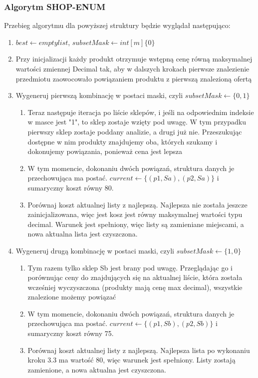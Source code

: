 \documentclass[a4paper]{article}
\begin{document}
\subsubsection{Algorytm SHOP-ENUM}
Przebieg algorytmu dla powyższej struktury będzie wyglądał następująco:
\begin{enumerate}
\item {$best \leftarrow empty list$, $subsetMask \leftarrow int[m]\{0\}$}
\item{ Przy inicjalizacji każdy produkt otrzymuje wstępną cenę równą maksymalnej wartości zmiennej Decimal tak, aby w dalszych krokach pierwsze znalezienie przedmiotu zaowocowało powiązaniem produktu z pierwszą znalezioną ofertą}
\item {Wygeneruj pierwszą kombinację w postaci maski, czyli $subsetMask \leftarrow \{0, 1\}$
\begin{enumerate}
\item {Teraz następuje iteracja po liście sklepów, i jeśli na odpowiednim indeksie w masce jest "1", to sklep zostaje wzięty pod uwagę. W tym przypadku pierwszy sklep zostaje poddany analizie, a drugi już nie. Przeszukując dostępne w nim produkty znajdujemy oba, których szukamy i dokonujemy powiązania, ponieważ cena jest lepsza}
\item{W tym momencie, dokonaniu dwóch powiązań, struktura danych je przechowująca ma postać.
$current \leftarrow \{(p1, Sa), (p2, Sa)\}$ i sumaryczny koszt równy 80.}
\item {Porównaj koszt aktualnej listy z najlepszą. Najlepsza nie została jeszcze zainicjalizowana, więc jest kosz jest równy maksymalnej wartości typu decimal. Warunek jest spełniony, więc listy są zamieniane miejscami, a nowa aktualna lista jest czyszczona.}
\end{enumerate}}
\item {Wygeneruj drugą kombinację w postaci maski, czyli $subsetMask \leftarrow \{1, 0\}$
\begin{enumerate}
\item {Tym razem tylko sklep Sb jest brany pod uwagę. Przeglądając go i porównując ceny do znajdujących się na aktualnej liście, która została wcześniej wyczyszczona (produkty mają cenę max decimal), wszystkie znalezione możemy powiązać}
\item{W tym momencie, dokonaniu dwóch powiązań, struktura danych je przechowująca ma postać.
$current \leftarrow \{(p1, Sb), (p2, Sb)\}$ i sumaryczny koszt równy 75.}
\item {Porównaj koszt aktualnej listy z najlepszą. Najlepsza lista po wykonaniu kroku 3.3 ma wartość 80, więc warunek jest spełniony. Listy zostają zamienione, a nowa aktualna jest czyszczona.}

\end{enumerate}}
\end{enumerate}
\end{document}
